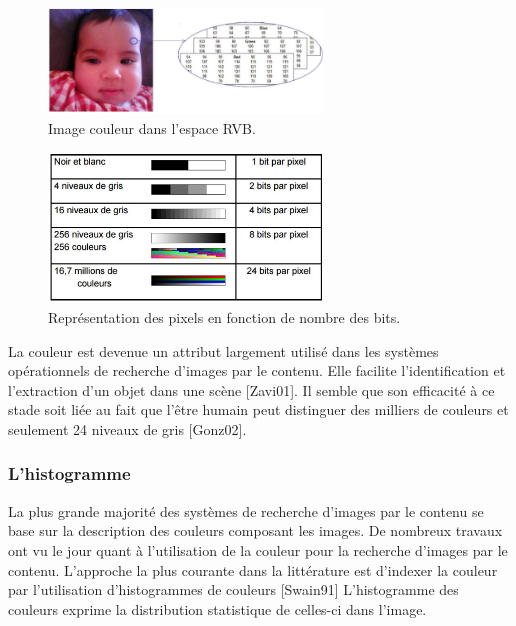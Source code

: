\begin{figure}[H]
	\label{fig:imageRVB}
	\centering
	\includegraphics[width=0.65\textwidth]{Figures/imageRVB} %
	
	\caption{Image couleur dans l’espace RVB.}
	
\end{figure}

\begin{figure}[H]
	\label{fig:tableRVB}
	\centering
	\includegraphics[width=0.65\textwidth]{Figures/tableRVB} %
	
	\caption{Représentation des pixels en fonction de nombre des bits.}
	
\end{figure}

La couleur est devenue un attribut largement utilisé dans les systèmes opérationnels de recherche d'images par le contenu. Elle facilite l'identification et l'extraction d'un objet dans une scène [Zavi01]. Il semble que son efficacité à ce stade soit liée au fait que l'être humain peut distinguer des milliers de couleurs et seulement 24 niveaux de gris [Gonz02].

\subsubsection{L'histogramme}
La plus grande majorité des systèmes de recherche d'images par le contenu se base sur la description des couleurs composant les images. De nombreux travaux ont vu le jour quant à l'utilisation de la couleur pour la recherche d’images par le contenu. L’approche la plus courante dans la littérature est d'indexer la couleur par l'utilisation d'histogrammes de couleurs [Swain91] L'histogramme des couleurs exprime la distribution statistique de celles-ci dans l'image.

